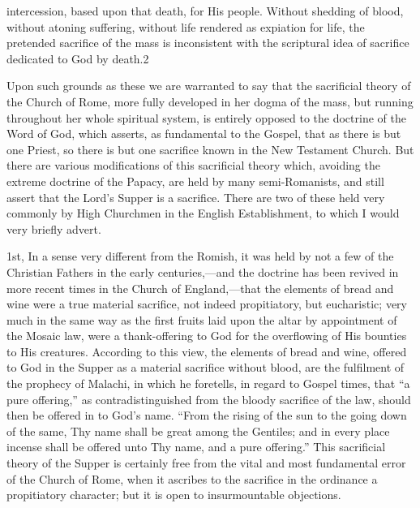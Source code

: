 \documentclass[]{book}
\begin{document}
intercession, based upon that death, for His people. Without shedding of blood, without atoning suffering, without life rendered as expiation for life, the pretended sacrifice of the mass is inconsistent with the scriptural idea of sacrifice dedicated to God by death.2

Upon such grounds as these we are warranted to say that the sacrificial theory of the Church of Rome, more fully developed in her dogma of the mass, but running throughout her whole spiritual system, is entirely opposed to the doctrine of the Word of God, which asserts, as fundamental to the Gospel, that as there is but one Priest, so there is but one sacrifice known in the New Testament Church. But there are various modifications of this sacrificial theory which, avoiding the extreme doctrine of the Papacy, are held by many semi-Romanists, and still assert that the Lord's Supper is a sacrifice. There are two of these held very commonly by High Churchmen in the English Establishment, to which I would very briefly advert.

1st, In a sense very different from the Romish, it was held by not a few of the Christian Fathers in the early centuries,---and the doctrine has been revived in more recent times in the Church of England,---that the elements of bread and wine were a true material sacrifice, not indeed propitiatory, but eucharistic; very much in the same way as the first fruits laid upon the altar by appointment of the Mosaic law, were a thank-offering to God for the overflowing of His bounties to His creatures. According to this view, the elements of bread and wine, offered to God in the Supper as a material sacrifice without blood, are the fulfilment of the prophecy of Malachi, in which he foretells, in regard to Gospel times, that ``a pure offering,'' as contradistinguished from the bloody sacrifice of the law, should then be offered in to God's name. ``From the rising of the sun to the going down of the same, Thy name shall be great among the Gentiles; and in every place incense shall be offered unto Thy name, and a pure offering.'' This sacrificial theory of the Supper is certainly free from the vital and most fundamental error of the Church of Rome, when it ascribes to the sacrifice in the ordinance a propitiatory character; but it is open to insurmountable objections.
\end{document}
